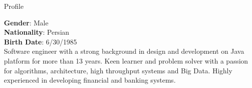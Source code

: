 
\begin{jrsection}[location = sidebar]{Profile}
    \begin{jrdescription}
        {\bfseries Gender}: Male \\
        {\bfseries Nationality}: Persian \\
        {\bfseries Birth Date}: 6/30/1985 \\
        Software engineer with a strong background in design and development on Java platform for more than 13 years.
        Keen learner and problem solver with a passion for algorithms, architecture, high throughput systems and Big Data.
        Highly experienced in developing financial and banking systems.
    \end{jrdescription}
\end{jrsection}
